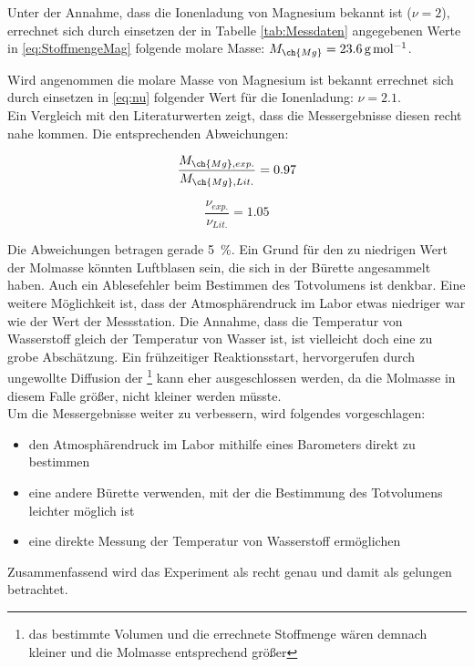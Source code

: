 \documentclass{article}
\begin{document}
    Unter der Annahme, dass die Ionenladung von Magnesium bekannt ist ($\nu=2$), errechnet sich durch einsetzen der in Tabelle \ref{tab:Messdaten} angegebenen Werte in \eqref{eq:StoffmengeMag} folgende molare Masse: $M_{\ch{Mg}}=\SI[mode=text]{23.6}{\gram\per\mole}$.
    
    Wird angenommen die molare Masse von Magnesium ist bekannt errechnet sich durch einsetzen in \eqref{eq:nu} folgender Wert für die Ionenladung: $\nu=2.1$. \\
    
    Ein Vergleich mit den Literaturwerten zeigt, dass die Messergebnisse diesen recht nahe kommen. Die entsprechenden Abweichungen: 
    
    \begin{equation}
      \frac{M_{\ch{Mg},exp.}}{M_{\ch{Mg},Lit.}}=0.97
    \end{equation}
      
    \begin{equation}
      \frac{\nu_{exp.}}{\nu_{Lit.}}=1.05
    \end{equation}
    
    Die Abweichungen betragen gerade \SI[mode=text]{5}{\percent}. Ein Grund für den zu niedrigen Wert der Molmasse könnten Luftblasen sein, die sich in der Bürette angesammelt haben. Auch ein Ablesefehler beim Bestimmen des Totvolumens ist denkbar. Eine weitere Möglichkeit ist, dass der Atmosphärendruck im Labor etwas niedriger war wie der Wert der Messstation. Die Annahme, dass die Temperatur von Wasserstoff gleich der Temperatur von Wasser ist, ist vielleicht doch eine zu grobe Abschätzung. Ein frühzeitiger Reaktionsstart, hervorgerufen durch ungewollte Diffusion der \footnote{das bestimmte Volumen und die errechnete Stoffmenge wären demnach kleiner und die Molmasse entsprechend größer} kann eher ausgeschlossen werden, da die Molmasse in diesem Falle größer, nicht kleiner werden müsste. \\
    
    Um die Messergebnisse weiter zu verbessern, wird folgendes vorgeschlagen:
    
    \begin{itemize}
      \item den Atmosphärendruck im Labor mithilfe eines Barometers direkt zu bestimmen
      \item eine andere Bürette verwenden, mit der die Bestimmung des Totvolumens leichter möglich ist
      \item eine direkte Messung der Temperatur von Wasserstoff ermöglichen
    \end{itemize}
    
     Zusammenfassend wird das Experiment als recht genau und damit als gelungen betrachtet.
     
  \pagebreak
  
  \listofreactions
  \printbibliography[title=Literaturverzeichnis]
  \listoffigures
  \listoftables
  
\end{document}
